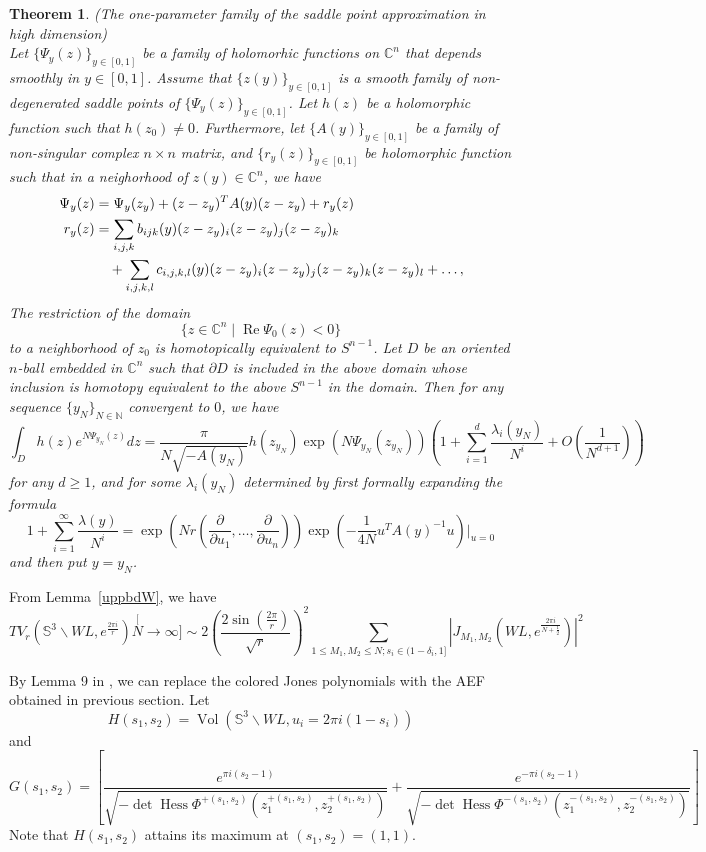 \documentclass[10pt,a4paper]{article}
\newcommand{\lt}{\left}
\newcommand{\rt}{\right}
\def\Vol{\operatorname{Vol}}
\def \CC{\mathbb C}
\def \Re{\operatorname{Re}}
\newtheorem{theorem}{Theorem}
\def\SS{{\mathbb S}}
\def\CC{{\mathbb C}}
\def\NN{{\mathbb N}}
\def\Vol{\operatorname{Vol}}
\def \Re{\operatorname{Re}}
\def \det{\operatorname{det}}
\def \Hess{\operatorname{Hess}}
\begin{document}
\begin{theorem} (The one-parameter family of the saddle point approximation in high dimension)\\
Let $\{\Psi_y (z)\}_{y\in[0,1]}$ be a family of holomorhic functions on $\CC^n$ that depends smoothly in $y \in [0,1]$. Assume that $\{z(y)\}_{y \in [0,1]}$ is a smooth family of non-degenerated saddle points of $\{\Psi_y(z)\}_{y\in[0,1]}$. Let $h(z)$ be a holomorphic function such that $h(z_0) \neq 0$. Furthermore, let $\{A(y)\}_{y\in [0,1]}$ be a family of non-singular complex $n\times n$ matrix, and $\{r_y(z)\}_{y\in [0,1]}$ be holomorphic function such that in a neighorhood of $z(y) \in \CC^n$, we have
\begin{align}
\Psi_y(z) &= \Psi_y(z_y) + (z-z_y)^T A(y) (z-z_y) + r_y(z) \\
r_y(z) 
& = \sum_{i,j,k} b_{ijk}(y) (z-z_y)_i (z-z_y)_j (z-z_y)_k \notag  \\
&\quad + \sum_{i,j,k,l} c_{i,j,k,l}(y) (z-z_y)_i (z-z_y)_j (z-z_y)_k (z-z_y)_l + \dots,
\end{align}
The restriction of the domain
$$ \{ z \in \CC^n \mid \Re \Psi_0 (z) < 0 \}$$
to a neighborhood of $z_0$ is homotopically equivalent to $S^{n-1}$. 
Let $D$ be an oriented $n$-ball embedded in $\CC^n$ such that $\partial D$ is included in the above domain whose inclusion is homotopy equivalent to the above $S^{n-1}$ in the domain. Then for any sequence $\{y_N\}_{N \in \NN}$ convergent to $0$, we have
$$\int_D h(z) e^{N \Psi_{y_N} (z)} dz = \frac{\pi}{N\sqrt{-A(y_N)}} h(z_{y_N}) \exp(N \Psi_{y_N} (z_{y_N})) \lt(  1+\sum_{i=1}^d \frac{\lambda_i (y_N)}{N^i} + O \lt(\frac{1}{N^{d+1}} \rt) \rt)$$
for any $d \geq 1$, and for some $\lambda_i (y_N)$ determined by first formally expanding the formula 
$$ 1+\sum_{i=1}^\infty \frac{\lambda(y)}{N^i} = \exp \lt( N r \lt( \frac{\partial}{\partial u_1}, \dots, \frac{\partial}{\partial u_n} \rt)\rt) \exp \lt( -\frac{1}{4N} u^T A(y)^{-1} u\rt)|_{u=0}$$
and then put $y = y_N$.
\end{theorem}
\fi

\iffalse
From Lemma~\ref{uppbdW}, we have
$$ TV_{r}\left(\SS^3 \backslash WL, e^{\frac{2\pi i}{r}}\right) \stackrel[N \to \infty]{\sim}{ }   2\lt( \frac{2\sin(\frac{2\pi}{r})}{\sqrt{r}}\rt)^{2} \sum_{1\leq M_1,M_2 \leq N; s_i\in (1-\delta_i,1]}\left|J_{M_1,M_2}\left(WL,e^{\frac{2\pi i }{N+\frac{1}{2}}}\right)\right|^2$$

By Lemma 9 in \cite{WA17}, we can replace the colored Jones polynomials with the AEF obtained in previous section. Let 
$$H(s_1,s_2)=   \Vol\lt(\SS^3 \backslash WL, u_i = 2\pi i (1 - s_i)\rt)$$ 
and 
$$G(s_1,s_2) = \lt[  \frac{e^{\pi i (s_2 -1)}}{ \sqrt{-\det\Hess \Phi^{+(s_1,s_2)}(z_1^{+(s_1,s_2)}, z_2^{+(s_1,s_2)})}}
+  \frac{ e^{-\pi i (s_2 -1)}}{ \sqrt{-\det\Hess \Phi^{-(s_1,s_2)}(z_1^{-(s_1,s_2)}, z_2^{-(s_1,s_2)})}}  \rt] $$
Note that $H(s_1,s_2)$ attains its maximum at $(s_1,s_2)=(1,1)$. 
\end{document}
